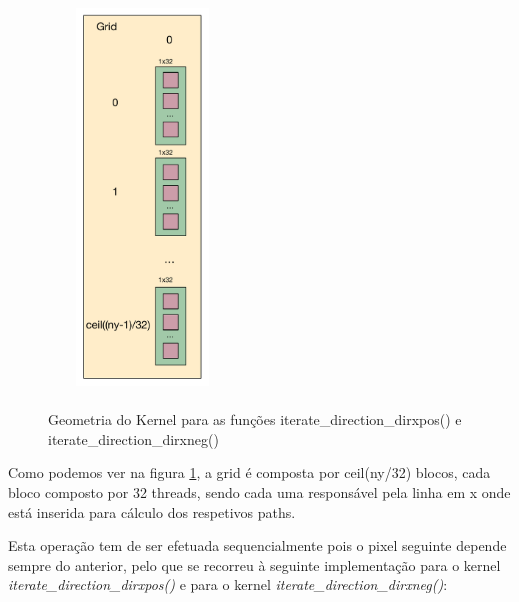\documentclass[pdftex,12pt,a4paper]{report}
\begin{document}
 \begin{figure}[!htb]
\center
 \includegraphics[width=50mm,height=100mm,scale=1]{IteratePositionDirxposneg_v1_kernel.pdf}
 \caption{\\ Geometria do Kernel para as funções iterate\_direction\_dirxpos() e iterate\_direction\_dirxneg()}
 \label{fig:IteratePositionDirxposneg_v1_kernel}
\end{figure}

Como podemos ver na figura \ref{fig:IteratePositionDirxposneg_v1_kernel}, a grid é composta por ceil(ny/32) blocos, cada bloco composto por 32 threads, sendo cada uma responsável pela linha em x onde está inserida para cálculo dos respetivos paths.

Esta operação tem de ser efetuada sequencialmente pois o pixel seguinte depende sempre do anterior, pelo que se recorreu à seguinte implementação para o kernel \textit{iterate\_direction\_dirxpos()} e para o kernel \textit{iterate\_direction\_dirxneg()}:
\end{document}
